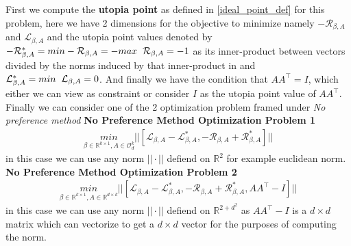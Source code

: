 First we compute the \textbf{utopia point} as defined in \ref{ideal_point_def} for this problem, here we have 2 dimensions for the objective to minimize namely $-\mathcal{R}_{\beta, A}$ and $\mathcal{L}_{\beta, A}$ and the utopia point values denoted by $-\mathcal{R}_{\beta, A}^* = min -\mathcal{R}_{\beta, A}  = - max\hspace{2mm} \mathcal{R}_{\beta, A} =  - 1 $ as its inner-product between vectors divided by the norms induced by that inner-product in and $\mathcal{L}_{\beta, A}^* =min \hspace{2mm} \mathcal{L}_{\beta, A} = 0$. And finally we have the condition that $AA^\top = I$, which either we can view as constraint or consider $I$ as the utopia point value of $AA^\top$. Finally we can consider one of the 2 optimization problem framed under \textit{No preference method}
\newline \textbf{No Preference Method Optimization Problem 1}
\begin{equation} \label{NPMOP_1:objective}
\begin{aligned}
    \underset{\beta\in \mathbb{R}^{k\times 1},A\in \mathcal{O}^{k}_{d}}{min} || [\mathcal{L}_{\beta, A}-\mathcal{L}_{\beta, A}^*,-\mathcal{R}_{\beta, A}+\mathcal{R}_{\beta, A}^*]||
\end{aligned}
\end{equation}
in this case we can use any norm $||\cdot ||$ defiend on $\mathbb{R}^2$ for example euclidean norm.
\hspace{2mm}
\newline \textbf{No Preference Method Optimization Problem 2}
\begin{equation} \label{NPMOP_2:objective}
\begin{aligned}
    \underset{\beta\in \mathbb{R}^{k\times 1},A\in \mathbb{R}^{d\times k}}{min} || [\mathcal{L}_{\beta, A}-\mathcal{L}_{\beta, A}^*,-\mathcal{R}_{\beta, A}+\mathcal{R}_{\beta, A}^*, AA^\top - I]||
\end{aligned}
\end{equation}
in this case we can use any norm $||\cdot ||$ defiend on $\mathbb{R}^{2+d^2}$ as $AA^\top -I$ is a $d\times d$ matrix which can vectorize to get a $d\times d$ vector for the purposes of computing the norm.
